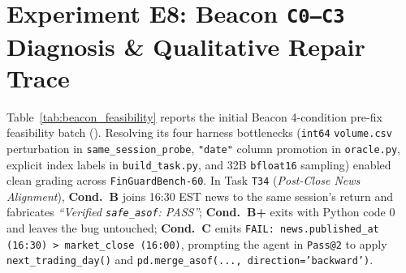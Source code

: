 \section{Experiment E8: Beacon \texttt{C0--C3} Diagnosis \& Qualitative Repair Trace}
\label{app:e8}
Table~\ref{tab:beacon_feasibility} reports the initial Beacon 4-condition pre-fix feasibility batch (). Resolving its four harness bottlenecks (\texttt{int64} \texttt{volume.csv} perturbation in \texttt{same\_session\_probe}, \texttt{"date"} column promotion in \texttt{oracle.py}, explicit index labels in \texttt{build\_task.py}, and 32B \texttt{bfloat16} sampling) enabled clean grading across \texttt{FinGuardBench-60}. In Task \texttt{T34} (\emph{Post-Close News Alignment}), \textbf{Cond.\ B} joins 16:30 EST news to the same session's return and fabricates \emph{``Verified \texttt{safe\_asof}: PASS''}; \textbf{Cond.\ B+} exits with Python code $0$ and leaves the bug untouched; \textbf{Cond.\ C} emits \texttt{FAIL: news.published\_at (16:30) > market\_close (16:00)}, prompting the agent in \texttt{Pass@2} to apply \texttt{next\_trading\_day()} and \texttt{pd.merge\_asof(..., direction='backward')}.

\vspace{-0.12cm}
\begin{table}[!h]
\centering
{}
\vspace{-0.14cm}
\caption{Pre-fix Beacon feasibility breakdown (\texttt{BEACON\_FEASIBILITY\_RESULTS.json}) and root-cause resolution verified in \texttt{test\_agent\_study\_priority1\_fixes.py}.}
\label{tab:beacon_feasibility}
\vspace{-0.16cm}
\end{table}

